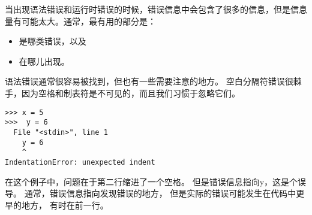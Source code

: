{{{{%

当出现语法错误和运行时错误的时候，错误信息中会包含了很多的信息，但是信息量有可能太大。通常，最有用的部分是：


\begin{itemize}

\item 是哪类错误，以及

\item 在哪儿出现。

\end{itemize}


语法错误通常很容易被找到，但也有一些需要注意的地方。
空白分隔符错误很棘手，因为空格和制表符是不可见的，而且我们习惯于忽略它们。

\begin{lstlisting}
>>> x = 5
>>>  y = 6
  File "<stdin>", line 1
    y = 6
    ^
IndentationError: unexpected indent
\end{lstlisting}

%

在这个例子中，问题在于第二行缩进了一个空格。
但是错误信息指向y，这是个误导。 通常，错误信息指向发现错误的地方，
但是实际的错误可能发生在代码中更早的地方， 有时在前一行。
  


}}}}
